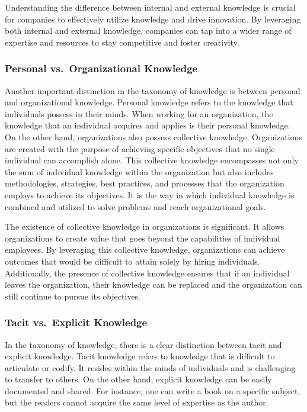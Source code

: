 Understanding the difference between internal and external knowledge is
crucial for companies to effectively utilize knowledge and drive
innovation. By leveraging both internal and external knowledge,
companies can tap into a wider range of expertise and resources to stay
competitive and foster creativity.

\subsubsection{Personal vs.~Organizational
    Knowledge}\label{personal-vs.-organizational-knowledge}

Another important distinction in the taxonomy of knowledge is between
personal and organizational knowledge. Personal knowledge refers to the
knowledge that individuals possess in their minds. When working for an
organization, the knowledge that an individual acquires and applies is
their personal knowledge. On the other hand, organizations also possess
collective knowledge. Organizations are created with the purpose of
achieving specific objectives that no single individual can accomplish
alone. This collective knowledge encompasses not only the sum of
individual knowledge within the organization but also includes
methodologies, strategies, best practices, and processes that the
organization employs to achieve its objectives. It is the way in which
individual knowledge is combined and utilized to solve problems and
reach organizational goals.

The existence of collective knowledge in organizations is significant.
It allows organizations to create value that goes beyond the
capabilities of individual employees. By leveraging this collective
knowledge, organizations can achieve outcomes that would be difficult to
attain solely by hiring individuals. Additionally, the presence of
collective knowledge ensures that if an individual leaves the
organization, their knowledge can be replaced and the organization can
still continue to pursue its objectives.

\subsubsection{Tacit vs.~Explicit
    Knowledge}\label{tacit-vs.-explicit-knowledge}

In the taxonomy of knowledge, there is a clear distinction between tacit
and explicit knowledge. Tacit knowledge refers to knowledge that is
difficult to articulate or codify. It resides within the minds of
individuals and is challenging to transfer to others. On the other hand,
explicit knowledge can be easily documented and shared. For instance,
one can write a book on a specific subject, but the readers cannot
acquire the same level of expertise as the author.

